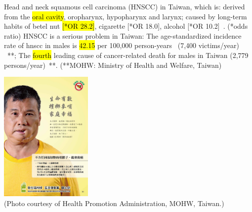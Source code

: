 \documentclass[
paper=landscape,
paper=160mm:90mm, %
fontsize=11pt, %
pagesize, %
parskip=half-, %
]{scrartcl} %
\theoremstyle{mythmstyle} %
\begin{document}
\begin{minipage}[c]{0.60\linewidth}
\begin{outline}
    \1 Head and neck squamous cell carcinoma (HNSCC) in Taiwan, which is:
        \2 derived from the \hl{oral cavity}, oropharynx, hypopharynx and larynx;
        \2 caused by long-term habits of betel nut \hl{[*OR 28.2]}, cigarette [*OR 18.0], alcohol [*OR 10.2]~\autocite{Ko1995}. {\tiny (*odds ratio)}
    \1  HNSCC is a serious problem in Taiwan:
        \2 The age-standardized incidence rate of \acrshort{hnscc} in males is \hl{42.15} per 100,000 person-years~ (7,400 victims/year) ~\autocite{MOHWincidence2018}**;
        \2 The \hl{fourth} leading cause of cancer-related death for males in Taiwan (2,779 persons/year)~\autocite{MOHWdeath2017}**.
        {\tiny (**MOHW: Ministry of Health and Welfare, Taiwan)}
\end{outline}
\end{minipage}%
\begin{minipage}[c]{0.35\linewidth}
    \raggedright
    \hfill
    \includegraphics[width=4.5cm]{20369933_1755313531164078_5705495585669958017_o.jpg}\\
   \tiny (Photo courtesy of Health Promotion Administration, MOHW, Taiwan.)

\end{minipage}




\clearpage

\thispagestyle{headings}
\end{document}
